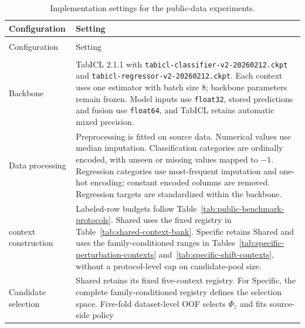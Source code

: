 \begingroup
  \scriptsize
  \setlength{\tabcolsep}{5pt}
  \renewcommand{\arraystretch}{1.0}
  \setlength{\LTpre}{0.45\baselineskip}
  \setlength{\LTpost}{0.45\baselineskip}
  \begin{longtable}{@{}>{\raggedright\arraybackslash}p{}
                      >{\raggedright\arraybackslash}p{}@{}}
    \caption{Implementation settings for the public-data experiments.}
    \label{tab:implementation-details} \\
    \toprule
    Configuration & Setting \\
    \midrule
    \endfirsthead
    \multicolumn{2}{@{}l}{\tablename~\thetable\ (continued)} \\
    \toprule
    Configuration & Setting \\
    \midrule
    \endhead
    \midrule
    \multicolumn{2}{r@{}}{Continued on next page} \\
    \endfoot
    \bottomrule
    \endlastfoot
    Backbone
      & TabICL 2.1.1 with
        \nolinkurl{tabicl-classifier-v2-20260212.ckpt} and
        \nolinkurl{tabicl-regressor-v2-20260212.ckpt}. Each context uses one
        estimator with batch size 8; backbone parameters remain frozen. Model
        inputs use \texttt{float32}, stored predictions and fusion use
        \texttt{float64}, and TabICL retains automatic mixed precision. \\
    Data processing
      & Preprocessing is fitted on source data. Numerical values use median
        imputation. Classification categories are ordinally encoded, with unseen
        or missing values mapped to $-1$. Regression categories use
        most-frequent imputation and one-hot encoding; constant encoded columns
        are removed. Regression targets are standardized within the backbone. \\
    context construction
      & Labeled-row budgets follow Table~\ref{tab:public-benchmark-protocols}.
        Shared uses the fixed registry in
        Table~\ref{tab:shared-context-bank}. Specific retains Shared and uses
        the family-conditioned ranges in
        Tables~\ref{tab:specific-perturbation-contexts}
        and~\ref{tab:specific-shift-contexts}, without a protocol-level cap on
        candidate-pool size. \\
    Candidate selection
      & Shared retains its fixed five-context registry. For Specific, the
        complete family-conditioned registry defines the selection space.
        Five-fold dataset-level OOF selects $\Phi_z$ and fits source-side policy

\end{longtable}
